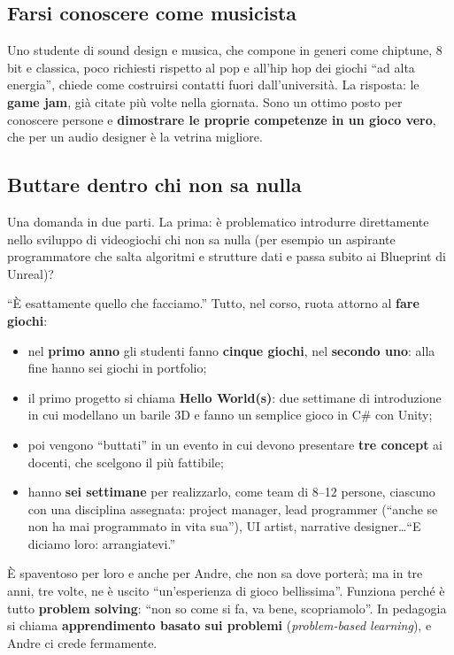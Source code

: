 \subsection{Farsi conoscere come musicista}

Uno studente di sound design e musica, che compone in generi come chiptune, 8 bit e
classica, poco richiesti rispetto al pop e all'hip hop dei giochi ``ad alta
energia'', chiede come costruirsi contatti fuori dall'università. La risposta: le
\textbf{game jam}, già citate più volte nella giornata. Sono un ottimo posto per
conoscere persone e \textbf{dimostrare le proprie competenze in un gioco vero}, che
per un audio designer è la vetrina migliore.

\subsection{Buttare dentro chi non sa nulla}

Una domanda in due parti. La prima: è problematico introdurre direttamente nello
sviluppo di videogiochi chi non sa nulla (per esempio un aspirante programmatore che
salta algoritmi e strutture dati e passa subito ai Blueprint di Unreal)?

``È esattamente quello che facciamo.'' Tutto, nel corso, ruota attorno al
\textbf{fare giochi}:
\begin{itemize}
  \item nel \textbf{primo anno} gli studenti fanno \textbf{cinque giochi}, nel
        \textbf{secondo uno}: alla fine hanno sei giochi in portfolio;
  \item il primo progetto si chiama \textbf{Hello World(s)}: due settimane di
        introduzione in cui modellano un barile 3D e fanno un semplice gioco in C\#
        con Unity;
  \item poi vengono ``buttati'' in un evento in cui devono presentare \textbf{tre
        concept} ai docenti, che scelgono il più fattibile;
  \item hanno \textbf{sei settimane} per realizzarlo, come team di 8--12 persone,
        ciascuno con una disciplina assegnata: project manager, lead programmer
        (``anche se non ha mai programmato in vita sua''), UI artist, narrative
        designer\dots ``E diciamo loro: arrangiatevi.''
\end{itemize}
È spaventoso per loro e anche per Andre, che non sa dove porterà; ma in tre anni,
tre volte, ne è uscito ``un'esperienza di gioco bellissima''. Funziona perché è tutto
\textbf{problem solving}: ``non so come si fa, va bene, scopriamolo''. In pedagogia
si chiama \textbf{apprendimento basato sui problemi} (\emph{problem-based learning}),
e Andre ci crede fermamente.

